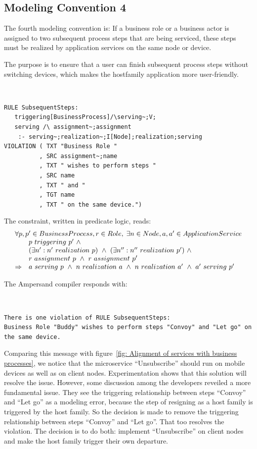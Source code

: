 \documentclass[sn-vancouver]{sn-jnl}%
\theoremstyle{thmstyleone}%
\theoremstyle{thmstyletwo}%
\theoremstyle{thmstylethree}%
\begin{document}
\subsection{Modeling Convention 4}\label{Modeling Convention 4}
The fourth modeling convention is:
If a business role or a business actor is assigned to two subsequent process steps that are being serviced,
these steps must be realized by application services on the same node or device.

The purpose is to ensure that a user can finish subsequent process steps without switching devices,
which makes the hostfamily application more user-friendly.

{\tt\small
\begin{lstlisting}[frame=single, label={mc4}, caption={}]
RULE SubsequentSteps:
   triggering[BusinessProcess]/\serving~;V;
   serving /\ assignment~;assignment
    :- serving~;realization~;I[Node];realization;serving
VIOLATION ( TXT "Business Role "
          , SRC assignment~;name
          , TXT " wishes to perform steps "
          , SRC name
          , TXT " and "
          , TGT name
          , TXT " on the same device.")
\end{lstlisting}
}

The constraint, written in predicate logic, reads:
\[\begin{array}{cl}
   \multicolumn{2}{l}{\forall p,p' \in BusinessProcess, r\in Role, \;\exists n\in Node, a,a'\in ApplicationService}\\
   &p\ triggering\ p'\ \wedge\\
   &(\exists n': n'\ realization\ p)\ \wedge\ (\exists n'': n''\ realization\ p')\ \wedge\\
   &r\ assignment\ p\ \wedge\ r\ assignment\ p'\\
   \Rightarrow&a\ serving\ p\ \wedge\ n\ realization\ a\ \wedge\ n\ realization\ a'\ \wedge\ a'\ serving\ p'\\
\end{array}\]

The Ampersand compiler responds with:

{\tt\small
\begin{lstlisting}[frame=single, label={mc4result}, caption={}]
There is one violation of RULE SubsequentSteps:
Business Role "Buddy" wishes to perform steps "Convoy" and "Let go" on the same device.
\end{lstlisting}
}

Comparing this message with figure~\ref{fig: Alignment of services with business processes},
we notice that the microservice ``Unsubscribe'' should run on mobile devices as well as on client nodes.
Experimentation shows that this solution will resolve the issue.
However, some discussion among the developers reveiled a more fundamental issue.
They see the triggering relationship between steps ``Convoy'' and ``Let go'' as a modeling error,
because the step of resigning as a host family is triggered by the host family.
So the decision is made to remove the triggering relationship between steps ``Convoy'' and ``Let go''.
That too resolves the violation.
The decision is to do both: implement ``Unsubscribe'' on client nodes and make the host family trigger their own departure.
\end{document}
